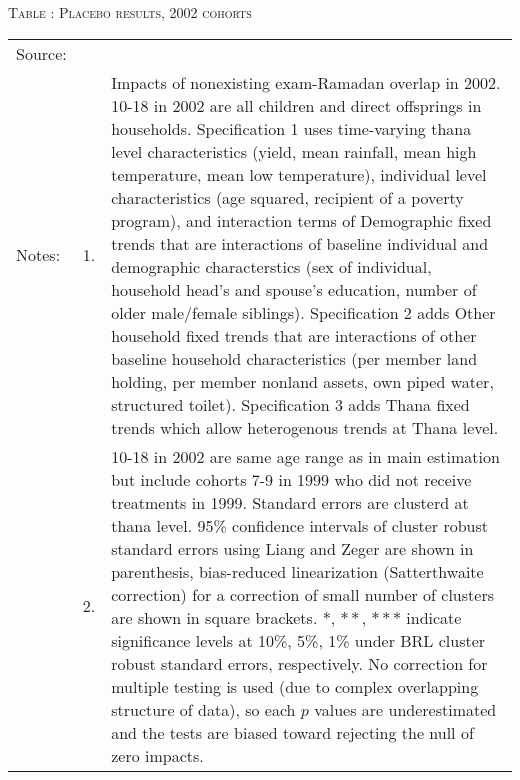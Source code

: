 \begin{table}
\hfil\textsc{\footnotesize Table \thetable: Placebo results, 2002 cohorts\label{PlaceboResults2002Table}}\\
\setlength{\tabcolsep}{1pt}
\renewcommand{\arraystretch}{.55}
\hfil

\renewcommand{\arraystretch}{1}
\hfil\begin{tabular}{>{\hfill\scriptsize}p{1cm}<{}>{\hfill\scriptsize}p{.5cm}<{}>{\scriptsize}p{12cm}<{\hfill}}
Source:& \multicolumn{2}{l}{\scriptsize Compiled from IFPRI data. Various cohorts.}\\[-1ex]
Notes:& 1. & Impacts of nonexisting exam-Ramadan overlap in 2002. \textsf{10-18 in 2002} are all children and direct offsprings in households. \textsf{Specification 1} uses time-varying thana level characteristics (yield, mean rainfall, mean high temperature, mean low temperature), individual level characteristics (age squared, recipient of a poverty program), and interaction terms of \textsf{Demographic fixed trends} that are interactions of baseline individual and demographic characterstics (sex of individual, household head's and spouse's education, number of older male/female siblings). \textsf{Specification 2} adds \textsf{Other household fixed trends} that are interactions of other baseline household characteristics (per member land holding, per member nonland assets, own piped water, structured toilet). \textsf{Specification 3} adds \textsf{Thana fixed trends} which allow heterogenous trends at Thana level. \\[-1ex]
& 2. & \textsf{10-18 in 2002} are same age range as in main estimation but include cohorts 7-9 in 1999 who did not receive treatments in 1999. Standard errors are clusterd at thana level. 95\% confidence intervals of cluster robust standard errors using Liang and Zeger are shown in parenthesis, bias-reduced linearization (Satterthwaite correction) for a correction of small number of clusters are shown in square brackets. $*$, $**$, $***$ indicate significance levels at 10\%, 5\%, 1\% under BRL cluster robust standard errors, respectively. No correction for multiple testing is used (due to complex overlapping structure of data), so each $p$ values are underestimated and the tests are biased toward rejecting the null of zero impacts. 
\end{tabular}
\end{table}

